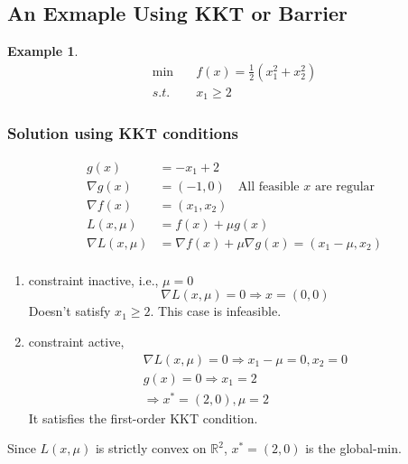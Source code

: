 \documentclass[11pt,a4paper]{article}
\newtheorem{example}{Example}
\begin{document}
\subsection{An Exmaple Using KKT or Barrier}
\begin{example}
\begin{equation}
    \begin{aligned}
        \min\quad&f(x)=\frac{1}{2}(x_1^2+x_2^2)\\
        s.t.\ & x_1\geq 2
    \end{aligned}
    \nonumber
\end{equation}
\end{example}
\subsubsection{Solution using KKT conditions}
\begin{equation}
    \begin{aligned}
        g(x)&=-x_1+2\\
        \nabla g(x)&=(-1,0)\quad \text{All feasible $x$ are regular}\\
        \nabla f(x)&=(x_1,x_2)\\
        L(x,\mu)&=f(x)+\mu g(x)\\
        \nabla L(x,\mu)&=\nabla f(x)+\mu \nabla g(x)=(x_1-\mu,x_2)\\
    \end{aligned}
    \nonumber
\end{equation}
\begin{enumerate}
    \item constraint inactive, i.e., $\mu=0$
    $$\nabla L(x,\mu)=0 \Rightarrow	x=(0,0)$$
    Doesn't satisfy $x_1\geq 2$. This case is infeasible.
    \item constraint active,
    \begin{equation}
        \begin{aligned}
            \nabla L(x,\mu)=0 \Rightarrow x_1-\mu=0,x_2=0\\
            g(x)=0 \Rightarrow x_1=2\\
            \Rightarrow	x^*=(2,0), \mu=2
        \end{aligned}
        \nonumber
    \end{equation}
    It satisfies the first-order KKT condition.
\end{enumerate}
Since $L(x,\mu)$ is strictly convex on $\mathbb{R}^2$, $x^*=(2,0)$ is the global-min.
\end{document}
